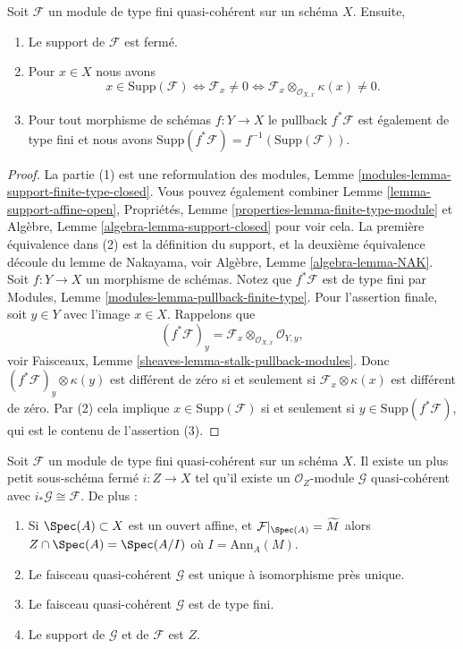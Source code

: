 \begin{lemma}
\label{lemma-support-finite-type}
Soit $\mathcal{F}$ un module de type fini quasi-cohérent sur un schéma
$X$. Ensuite,
\begin{enumerate}
\item Le support de $\mathcal{F}$ est fermé.
\item Pour $x \in X$ nous avons
$$
x \in \text{Supp}(\mathcal{F})
\Leftrightarrow
\mathcal{F}_x \not = 0
\Leftrightarrow
\mathcal{F}_x \otimes_{\mathcal{O}_{X, x}} \kappa(x) \not = 0.
$$
\item Pour tout morphisme de schémas $f : Y \to X$
le pullback $f^*\mathcal{F}$ est également
de type fini et nous avons $\text{Supp}(f^*\mathcal{F}) = f^{-1}(\text{Supp}(\mathcal{F}))$.
\end{enumerate}
\end{lemma}

\begin{proof}
La partie (1) est une reformulation
des modules, Lemme \ref{modules-lemma-support-finite-type-closed}. Vous pouvez
également combiner
Lemme \ref{lemma-support-affine-open}, Propriétés,
Lemme \ref{properties-lemma-finite-type-module} et Algèbre, Lemme \ref{algebra-lemma-support-closed}
pour
voir cela. La première équivalence
dans (2) est la définition du support, et la deuxième
équivalence découle du lemme de Nakayama,
voir Algèbre,
Lemme \ref{algebra-lemma-NAK}. Soit $f : Y \to X$
un morphisme de schémas. Notez que
$f^*\mathcal{F}$ est de type fini par
Modules, Lemme \ref{modules-lemma-pullback-finite-type}. Pour l'assertion finale,
soit $y \in Y$ avec l'image $x \in X$. Rappelons
que
$$
(f^*\mathcal{F})_y =
\mathcal{F}_x \otimes_{\mathcal{O}_{X, x}} \mathcal{O}_{Y, y},
$$
voir
Faisceaux, Lemme \ref{sheaves-lemma-stalk-pullback-modules}. Donc $(f^*\mathcal{F})_y \otimes \kappa(y)$
est différent de zéro si et seulement
si $\mathcal{F}_x \otimes \kappa(x)$ est différent de zéro. Par
(2) cela implique $x \in \text{Supp}(\mathcal{F})$ si et seulement
si $y \in \text{Supp}(f^*\mathcal{F})$, qui est le contenu de l'assertion
(3).
\end{proof}

\begin{lemma}
\label{lemma-scheme-theoretic-support}
Soit $\mathcal{F}$ un module de type fini quasi-cohérent
sur un schéma $X$. Il existe un plus petit
sous-schéma fermé $i : Z \to X$ tel qu'il existe
un $\mathcal{O}_Z$-module $\mathcal{G}$ quasi-cohérent
avec $i_*\mathcal{G} \cong \mathcal{F}$. De plus :
\begin{enumerate}
\item Si $\Spec(A) \subset X$ est un ouvert
affine, et $\mathcal{F}|_{\Spec(A)} = \widetilde{M}$
alors $Z \cap \Spec(A) = \Spec(A/I)$ où $I = \text{Ann}_A(M)$.
\item Le faisceau quasi-cohérent $\mathcal{G}$ est unique à isomorphisme près
unique.
\item Le faisceau quasi-cohérent $\mathcal{G}$ est de type fini.
\item Le support de $\mathcal{G}$ et de $\mathcal{F}$ est $Z$.
\end{enumerate}
\end{lemma}

